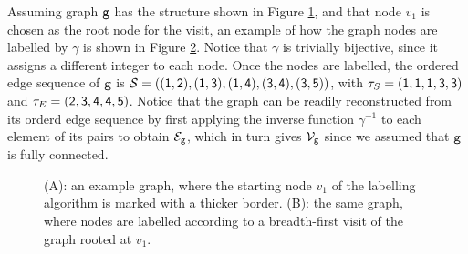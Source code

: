 Assuming graph $\mathtt{g}$ has the structure shown in Figure \ref{fig:example-graph}, and that node $v_1$ is chosen as the root node for the visit, an example of how the graph nodes are labelled by $\gamma$ is shown in Figure \ref{fig:labelled-graph}. Notice that $\gamma$ is trivially bijective, since it assigns a different integer to each node. Once the nodes are labelled, the ordered edge sequence of $\mathtt{g}$ is $\OES{S} = (\OElem{1}{2},\OElem{1}{3},\OElem{1}{4},\OElem{3}{4},\OElem{3}{5})$, with $\tau_S = (\mathsf{1},\mathsf{1},\mathsf{1},\mathsf{3},\mathsf{3})$ and $\tau_E = (\mathsf{2},\mathsf{3},\mathsf{4},\mathsf{4},\mathsf{5})$. Notice that the graph can be readily reconstructed from its orderd edge sequence by first applying the inverse function $\gamma^{-1}$ to each element of its pairs to obtain $\Edges{g}$, which in turn gives $\Nodes{g}$ since we assumed that $\mathtt{g}$ is fully connected.

\begin{figure}[h!]
    \begin{subfigure}[b]{0.48\linewidth}
        \centering
        \resizebox{.8\textwidth}{!}{}
        \caption{}
        \label{fig:example-graph}
    \end{subfigure}
    \begin{subfigure}[b]{0.48\linewidth}
        \centering
        \resizebox{.8\textwidth}{!}{}
        \caption{}
        \label{fig:labelled-graph}
    \end{subfigure}
    \caption{({\scriptsize A}): an example graph, where the starting node $v_1$ of the labelling algorithm is marked with a thicker border. ({\scriptsize B}): the same graph, where nodes are labelled according to a breadth-first visit of the graph rooted at $v_1$.}
    \label{fig:labelling-example}
\end{figure}

